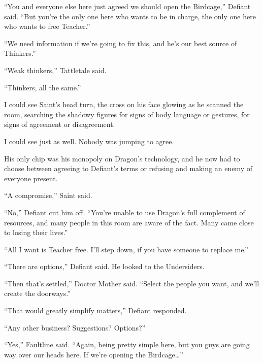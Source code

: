 ``You and everyone else here just agreed we should open the Birdcage,'' Defiant said.  ``But you're the only one here who wants to be in charge, the only one here who wants to free Teacher.''



``We need information if we're going to fix this, and he's our best source of Thinkers.''



``Weak thinkers,'' Tattletale said.



``Thinkers, all the same.''



I could see Saint's head turn, the cross on his face glowing as he scanned the room, searching the shadowy figures for signs of body language or gestures, for signs of agreement or disagreement.



I could see just as well.  Nobody was jumping to agree.



His only chip was his monopoly on Dragon's technology, and he now had to choose between agreeing to Defiant's terms or refusing and making an enemy of everyone present.



``A compromise,'' Saint said.



``No,'' Defiant cut him off.  ``You're unable to use Dragon's full complement of resources, and many people in this room are aware of the fact.  Many came close to losing their lives.''



``All I want is Teacher free.  I'll step down, if you have someone to replace me.''



``There are options,'' Defiant said.  He looked to the Undersiders.



``Then that's settled,'' Doctor Mother said.  ``Select the people you want, and we'll create the doorways.''



``That would greatly simplify matters,'' Defiant responded.



``Any other business?  Suggestions?  Options?''



``Yes,'' Faultline said.  ``Again, being pretty simple here, but you guys are going way over our heads here.  If we're opening the Birdcage\ldots''



